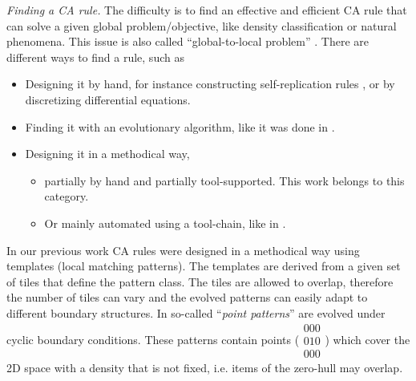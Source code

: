 \documentclass[10pt,a4paper]{article}  %
\begin{document}
\textit{Finding a CA rule.}
The difficulty is to find an effective and efficient CA rule that can solve a 
given global problem/objective,
like density classification or
natural phenomena.
This issue is also called ``global-to-local problem''
\cite{Nagpal2008,Yamins2008}.
There are different ways to find a rule, such as
\begin{itemize}
	\item 
	Designing it by hand, for instance constructing self-replication rules
\cite{Beuchat2000}, or by discretizing differential equations. %

  \item
	Finding it with an evolutionary algorithm, like it was done in
   \cite
  {Mitchell1996,
  Capcarrere2002,
  2014-Hoffmann-ACRI-Pattern,%
  2016-Hoffmann-D-ACRI-LinePattern}.  
	
	\item
	Designing it in a methodical way, 
  
          \begin{itemize}
            \item 
             partially by hand and partially tool-supported.
            This work belongs to this category.
              \item
              Or mainly automated using a tool-chain, like in
              \cite{Nagpal2008,Yamins2008,Bandini2009}.   %
          \end{itemize}
	
\end{itemize}


In our previous work 
\cite{
2019-pact-domino,
2020-HoffmannSeredynski-SensorPoint,
Hoffmann-2021,
Deserable2023,
Hoffmann-2021-MinimalDominoPact,
Hoffmann-2022-PointPattern,
Hoffmann-2002-LoopPattern}
%
CA rules were designed in a methodical way
using templates (local matching patterns).
The templates are derived from a given set of tiles that define the pattern class.
The tiles are allowed to overlap, therefore
the number of tiles can vary and  the evolved patterns 
can easily adapt to different boundary structures.
In \cite{
Hoffmann-2022-PointPattern}
so-called ``\textit{point patterns}'' are evolved under cyclic boundary conditions.
These patterns contain 
points 
($\substack{000
          \\010
          \\000}$)    
which cover the 2D space with
a density that is not fixed, i.e.
items of the zero-hull may overlap. 
\end{document}
